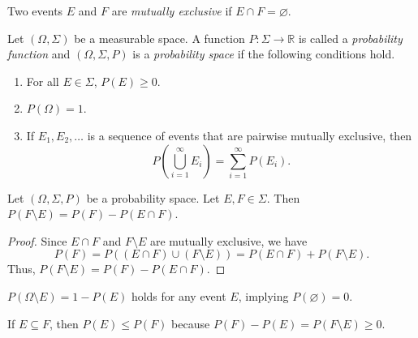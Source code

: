 \begin{definition}
  Two events $E$ and $F$ are \emph{mutually exclusive} if
  $E \cap F = \varnothing$.
\end{definition}

\begin{definition}
  Let $(\Omega, \Sigma)$ be a measurable space.
  A function $P: \Sigma \to \mathbb{R}$ is called a
  \emph{probability function} and $(\Omega, \Sigma, P)$ is a
  \emph{probability space} if the following conditions hold.
  \begin{enumerate}
    \item For all $E \in \Sigma$, $P(E) \geq 0$.
    \item $P(\Omega) = 1$.
    \item If $E_1, E_2, \dots$ is a sequence of events that are pairwise
      mutually exclusive, then
      \begin{equation*}
        P\left(\bigcup_{i=1}^\infty E_i\right)
        = \sum_{i=1}^\infty P(E_i).
      \end{equation*}
  \end{enumerate}
\end{definition}

\begin{theorem}\label{thm:probability}
  Let $(\Omega, \Sigma, P)$ be a probability space.
  Let $E, F \in \Sigma$.
  Then $P(F \setminus E) = P(F) - P(E \cap F)$.
\end{theorem}
\begin{proof}
  Since $E \cap F$ and $F \setminus E$ are mutually exclusive, we have
  \begin{equation*}
    P(F)
    = P((E \cap F) \cup (F \setminus E))
    = P(E \cap F) + P(F \setminus E).
  \end{equation*}
  Thus, $P(F \setminus E) = P(F) - P(E \cap F)$.
\end{proof}

\begin{corollary}
  $P(\Omega \setminus E) = 1 - P(E)$ holds for any event $E$,
  implying $P(\varnothing) = 0$.
\end{corollary}

\begin{corollary}
  If $E \subseteq F$, then $P(E) \leq P(F)$
  because $P(F) - P(E) = P(F \setminus E) \geq 0$.
\end{corollary}

